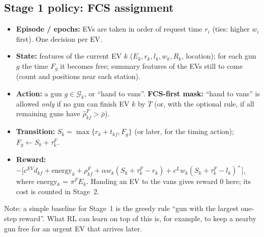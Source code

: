 \documentclass[11pt,a4paper]{article}
\newif\ifTOU \TOUfalse   %
\newcommand{\G}{\mathcal{G}}
\newcommand{\pk}{\mathrm{pk}}
\newcommand{\off}{\mathrm{off}}
\begin{document}
\subsection{Stage 1 policy: FCS assignment}
\begin{itemize}[leftmargin=1.4em,itemsep=2pt]
  \item \textbf{Episode / epochs:} EVs are taken in order of request time $r_i$ (ties: higher $w_i$ first). One decision per EV.
  \item \textbf{State:} features of the current EV $k$ ($E_k,r_k,l_k,w_k,R_k$, location); for each gun $g$ the time $F_g$ it becomes free; summary features of the EVs still to come (count and positions near each station)\ifTOU; the current price and the time until $T_1$ and $T_2$\fi.
  \item \textbf{Action:} a gun $g\in\G_k$, or ``hand to vans''. \textbf{FCS-first mask:} ``hand to vans'' is allowed \emph{only} if no gun can finish EV $k$ by $T$ (or, with the optional rule, if all remaining guns have $\hat\rho^F_{kf}>\bar\rho$).
  \ifTOU\item \textbf{Optional timing action:} ``gun $g$, start after the peak'', i.e.\ $S_k=\max\{\text{earliest},T_2\}$, allowed only if the session still ends by $T$.\fi
  \item \textbf{Transition:} $S_k=\max\{r_k+t_{kf},F_g\}$ (or later, for the timing action); $F_g\leftarrow S_k+\tau^F_k$.
  \item \textbf{Reward:} $-\Big[c^{EV}d_{kf}+\text{energy}_k+\rho^F_{kf}+\alpha w_k(S_k+\tau^F_k-r_k)+c^Lw_k(S_k+\tau^F_k-l_k)^+\Big]$, where energy$_k$ = \ifTOU$P^F\big[\pi^\off\cdot(\text{off-peak hours of }[S_k,S_k+\tau^F_k])+\pi^\pk\cdot(\text{peak hours})\big]$, computed exactly in the simulator\else$\pi^FE_k$\fi. Handing an EV to the vans gives reward $0$ here; its cost is counted in Stage~2.
\end{itemize}
Note: a simple baseline for Stage~1 is the greedy rule ``gun with the largest one-step reward''. What RL can learn on top of this is, for example, to keep a nearby gun free for an urgent EV that arrives later.
\end{document}
